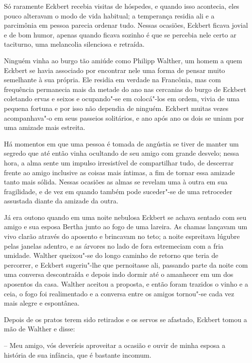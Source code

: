  Só raramente Eckbert recebia visitas de hóspedes, e quando isso
acontecia, eles pouco alteravam o modo de vida habitual; a temperança
residia ali e a parcimônia em pessoa parecia ordenar tudo. Nessas
ocasiões, Eckbert ficava jovial e de bom humor, apenas quando ficava
sozinho é que se percebia nele certo ar taciturno, uma melancolia
silenciosa e retraída.

 Ninguém vinha ao burgo tão amiúde como Philipp Walther, um homem a quem
Eckbert se havia associado por encontrar nele uma forma de pensar muito
semelhante à sua própria. Ele residia em verdade na Francônia, mas com
frequência permanecia mais da metade do ano nas cercanias do burgo de
Eckbert coletando ervas e seixos e ocupando"-se em colocá"-los em ordem,
vivia de uma pequena fortuna e por isso não dependia de ninguém.
Eckbert muitas vezes acompanhava"-o em seus passeios solitários, 
e ano após ano os dois se uniam por uma amizade mais estreita.

 Há momentos em que uma pessoa é tomada de angústia se tiver de manter um
segredo que até então vinha ocultando de seu amigo com grande desvelo;
nessa hora, a alma sente um impulso irresistível de compartilhar tudo,
de descerrar frente ao amigo inclusive as coisas mais íntimas, a fim de
tornar essa amizade tanto mais sólida. Nessas ocasiões as almas se
revelam uma à outra em sua fragilidade, e de vez em quando também pode
suceder"-se de uma retroceder assustada diante da amizade da outra.

Já era outono quando em uma noite nebulosa Eckbert se achava sentado com
seu amigo e sua esposa Bertha junto ao fogo de uma lareira. As chamas
lançavam um vivo clarão através do aposento e brincavam no teto; a
noite espreitava lúgubre pelas janelas adentro, e as árvores no lado de
fora estremeciam com a fria umidade. Walther queixou"-se do longo
caminho de retorno que teria de percorrer, e Eckbert sugeriu"-lhe que
pernoitasse ali, passando parte da noite com uma conversa descontraída
e depois indo dormir até o amanhecer em um dos aposentos da casa.
Walther aceitou a proposta, e então foram trazidos o vinho e a ceia, o
fogo foi realimentado e a conversa entre os amigos tornou"-se 
cada vez mais alegre e espontânea.

Depois de os pratos terem sido retirados e os servos se afastado,
Eckbert tomou a mão de Walther e disse:

-- Meu amigo, vós deveríeis aproveitar a ocasião e ouvir de minha
esposa a história de sua infância, que é bastante incomum.

